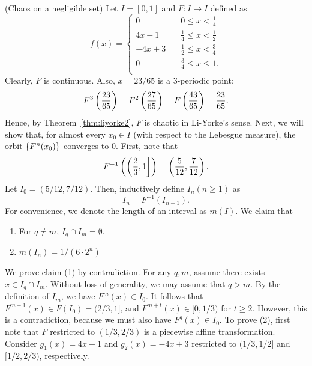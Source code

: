 \documentclass[10pt,draft,twoside]{book}
\begin{document}
\begin{example}
  (Chaos on a negligible set)
  Let $I = [0,1]$ and $F: I \to I$ defined as
  \begin{equation*}
    f(x) =
    \begin{cases}
      0 \quad & 0\leq x < \frac{1}{4} \\
      4x - 1 \quad  & \frac{1}{4} \leq x < \frac{1}{2} \\
      -4x + 3 \quad & \frac{1}{2} \leq x < \frac{3}{4} \\
      0 \quad & \frac{3}{4} \leq x \leq 1. \\
    \end{cases}
  \end{equation*}
  Clearly, $F$ is continuous.
  Also, $x = 23/65$ is a 3-periodic point:
  \begin{equation*}
    F^{3}\left ( \frac{23}{65} \right ) = F^{2}\left ( \frac{27}{65} \right ) = F\left ( \frac{43}{65} \right ) = \frac{23}{65}.
  \end{equation*}
Hence, by Theorem~\ref{thm:liyorke2}, $F$ is chaotic in Li-Yorke's sense.
%
Next, we will show that, for almost every $x_0 \in I$ (with respect to the Lebesgue measure), the orbit $\left \{ F^{n}(x_0) \right \}$ converges to 0.
First, note that 
\begin{equation*}
  F^{-1}\left ( \left(\frac{2}{3},1\right] \right ) 
  = \left ( \frac{5}{12},\frac{7}{12} \right ).
\end{equation*}
Let $I_0 = (5/12, 7/12)$.
Then, inductively define $I_n (n\geq 1)$ as 
\begin{equation*}
  I_n = F^{-1}(I_{n-1}).
\end{equation*}
%
For convenience, we denote the length of an interval as $m(I)$.
We claim that
\begin{enumerate}[(1)]
  \item For $q\neq m$, $I_q \cap I_m = \emptyset$.
  \item $m(I_n) = 1/(6 \cdot 2^n)$
\end{enumerate}
%
We prove claim (1) by contradiction.
For any $q,m$, assume there exists $x \in I_q \cap I_m$. 
Without loss of generality, we may assume that $q > m$.
By the definition of $I_m$, we have $F^m(x) \in I_0$.
It follows that $F^{m+1}(x) \in F(I_0) = (2/3, 1]$, and $F^{m+t}(x) \in [0, 1/3)$ for $t \geq 2$.
However, this is a contradiction, because we must also have $F^q(x) \in I_0$.
%
To prove (2), first note that $F$ restricted to $(1/3, 2/3)$ is a piecewise affine transformation.
Consider $g_1(x) = 4x - 1$ and $g_2(x) = -4x + 3$ restricted to $(1/3,1/2]$ and $[1/2,2/3)$, respectively.

\end{example}
\end{document}
